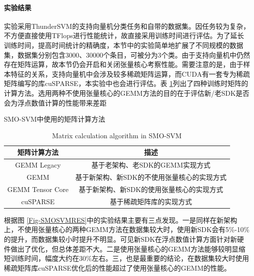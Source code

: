 \paragraph{实验结果}
\par 实验采用ThunderSVM的支持向量机分类任务和自带的数据集。因任务较为复杂，不方便直接使用TFlops进行性能统计，故直接采用训练时间进行评估。为了延长训练时间，提高时间统计的精确度，本节中的实验简单地扩展了不同规模的数据集，数据集分别包含3000、30000个条目，可被分为3个类。由于支持向量机中仍然存在矩阵运算，故本节仍会开启和关闭张量核心考察性能。需要注意的是，由于样本特征的关系，支持向量机中会涉及较多稀疏矩阵运算，而CUDA有一套专为稀疏矩阵编写的库cuSPARSE，本实验中也会进行评估。表 \ref{table-SMOSVM}列出了四种训练时矩阵的计算方法。选用两种不使用张量核心的GEMM方法的目的在于评估新/老SDK是否会为浮点数值计算的性能带来差距
\begin{table}
	\centering
	\renewcommand{\thetable}{\arabic{section}-\arabic{table} }
	\renewcommand{\tablename}{表}
	\caption{SMO-SVM中使用的矩阵计算方法}
	\addtocounter{table}{-1}
	\renewcommand{\thetable}{\arabic{section}-\arabic{table} }
	\renewcommand{\tablename}{Table}
	\caption{Matrix calculation algorithm in SMO-SVM}
	\begin{tabular}{cc}
		\toprule
		矩阵计算方法 & 描述	\\
		\midrule
		GEMM Legacy & 基于老架构、老SDK的GEMM实现方式\\
		GEMM & 基于新架构、新SDK的不使用张量核心的实现方式\\
		GEMM Tensor Core& 基于新架构、新SDK的使用张量核心的实现方式\\
		cuSPARSE & 基于稀疏矩阵库的实现方式\\
		\bottomrule
	\end{tabular} \label{table-SMOSVM} 
\end{table}
\par 根据图 \ref{Fig-SMOSVMRES}中的实验结果主要有三点发现。一是同样在新架构上，不使用张量核心的两种GEMM方法在数据集较大时，使用新SDK会有5\%-10\%的提升，而数据集较小时提升不明显。可见新SDK在浮点数值计算方面针对新硬件做出了优化，但总体差距不大。二是使用张量核心的GEMM方法能够较明显缩短训练时间，幅度大约在30\%左右。三，也是最重要的结论，在数据集较大时使用稀疏矩阵库cuSPARSE优化后的性能超过了使用张量核心的GEMM的性能。
